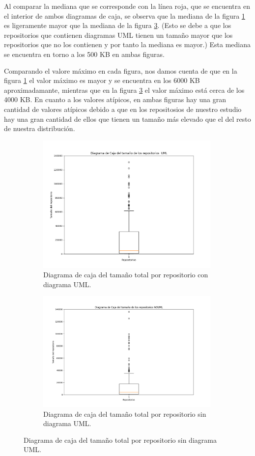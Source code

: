 \documentclass[a4paper, 12pt]{book}
\begin{document}
Al comparar la mediana que se corresponde con la línea roja, que se encuentra en el interior de ambos diagramas de caja, se observa que la mediana de la figura \ref{fig:Figure_sizeUML} es ligeramente mayor que la mediana de la figura \ref{fig:Figure_sizeNOUML}.
(Esto se debe a que los repositorios que contienen diagramas UML tienen un tamaño mayor que los repositorios que no los contienen y por tanto la mediana es mayor.)
Esta mediana se encuentra en torno a los 500 KB en ambas figuras.


Comparando el valore máximo en cada figura, nos damos cuenta de que en la figura \ref{fig:Figure_sizeUML} el valor máximo es mayor y se encuentra en los 6000 KB aproximadamante, mientras que en la figura \ref{fig:Figure_sizeNOUML} el valor máximo está cerca de los 4000 KB.
En cuanto a los valores atípicos, en ambas figuras hay una gran cantidad de valores atípicos debido a que en los repositosios de nuestro estudio hay una gran cantidad de ellos que tienen un tamaño más elevado que el del resto de nuestra distribución.

\begin{figure}
  \centering
  \begin{subfigure}{0.45\linewidth}
    \centering
    \includegraphics[width=9cm, keepaspectratio]{img/Figure_sizeUML.png}
    \caption{Diagrama de caja del tamaño total por repositorio con diagrama UML.}\label{fig:Figure_sizeUML}
  \end{subfigure}
  \hfill
    \begin{subfigure}{0.45\linewidth}
      \centering
      \includegraphics[width=9cm, keepaspectratio]{img/Figure_sizeNOUML.png}
      \caption{Diagrama de caja del tamaño total por repositorio sin diagrama UML.}\label{fig:Figure_sizeNOUML}
  \end{subfigure}
\end{figure}
\end{document}
